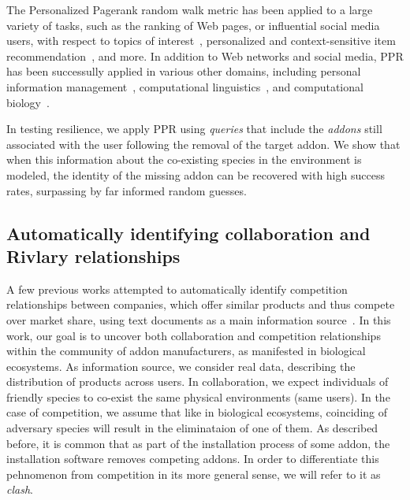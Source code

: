 \documentclass[ijoc,nonblindrev]{informs3} %
\numberwithin{equation}{subsection}
\begin{document}
The Personalized Pagerank random walk metric has been applied to a large variety of tasks, such as the ranking of Web pages, or influential social media users, with respect to topics of interest~\citep{haveliwala2003topic,weng2010twitterrank}, personalized and context-sensitive item  recommendation~\citep{lee2011random,bagciKAIS16}, and more. In addition to Web networks and social media, PPR has been successully applied in various other domains, including personal information management~\citep{minkov2010improving}, computational linguistics~\citep{agirreEACL09}, and computational biology~\citep{freschi2007protein}. 

In testing resilience, we apply PPR using {\it queries} that include the {\it addons} still associated with the user following the removal of the target addon. We show that when this information about the co-existing species in the environment is modeled, the identity of the missing addon can be recovered with high success rates, surpassing by far informed random guesses. 

\subsection{Automatically identifying collaboration and Rivlary relationships}

A few previous works attempted to automatically identify competition relationships between companies, which offer similar products and thus compete over market share, using text documents as a main information source~\citep{baoTKDE08,yangCIKM12}. In this work, our goal is to uncover both collaboration and competition relationships within the community of addon manufacturers, as manifested in biological ecosystems. As information source, we consider real data, describing the distribution of products across users. In collaboration, we expect individuals of friendly species to co-exist the same physical environments (same users). In the case of competition, we assume that like in biological ecosystems, coinciding of adversary species will result in the eliminataion of one of them. As described before, it is common that as part of the installation process of some addon, the installation software removes competing addons. In order to differentiate this pehnomenon from competition in its more general sense, we will refer to it as {\it clash}. 
\end{document}
